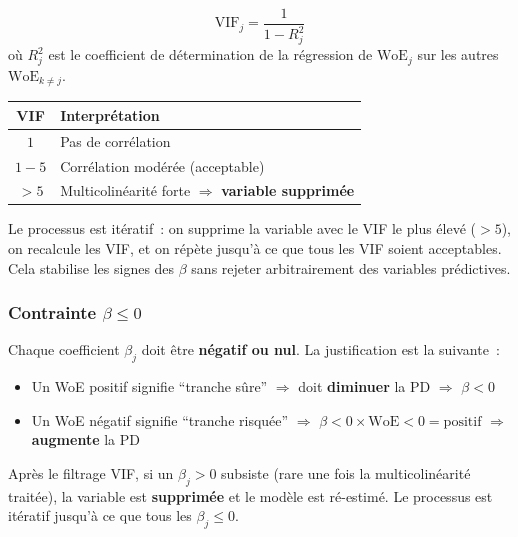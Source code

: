 \documentclass[12pt,a4paper]{article}
\begin{document}
\begin{formulebox}
\begin{equation}
    \text{VIF}_j = \frac{1}{1 - R_j^2}
    \label{eq:vif}
\end{equation}
o\`u $R_j^2$ est le coefficient de d\'etermination de la r\'egression de $\text{WoE}_j$ sur les autres $\text{WoE}_{k \neq j}$.
\end{formulebox}

\begin{center}
\begin{tabular}{cl}
\toprule
\textbf{VIF} & \textbf{Interpr\'etation} \\
\midrule
$1$ & Pas de corr\'elation \\
$1 - 5$ & Corr\'elation mod\'er\'ee (acceptable) \\
$> 5$ & Multicolin\'earit\'e forte $\Rightarrow$ \textbf{variable supprim\'ee} \\
\bottomrule
\end{tabular}
\end{center}

Le processus est it\'eratif~: on supprime la variable avec le VIF le plus \'elev\'e ($> 5$), on recalcule les VIF, et on r\'ep\`ete jusqu'\`a ce que tous les VIF soient acceptables. Cela stabilise les signes des $\beta$ sans rejeter arbitrairement des variables pr\'edictives.

\subsubsection{Contrainte $\beta \leq 0$}

Chaque coefficient $\beta_j$ doit \^etre \textbf{n\'egatif ou nul}. La justification est la suivante~:

\begin{itemize}
    \item Un WoE positif signifie ``tranche s\^ure'' $\Rightarrow$ doit \textbf{diminuer} la PD $\Rightarrow$ $\beta < 0$
    \item Un WoE n\'egatif signifie ``tranche risqu\'ee'' $\Rightarrow$ $\beta < 0 \times \text{WoE} < 0 = \text{positif}$ $\Rightarrow$ \textbf{augmente} la PD \checkmark
\end{itemize}

Apr\`es le filtrage VIF, si un $\beta_j > 0$ subsiste (rare une fois la multicolin\'earit\'e trait\'ee), la variable est \textbf{supprim\'ee} et le mod\`ele est r\'e-estim\'e. Le processus est it\'eratif jusqu'\`a ce que tous les $\beta_j \leq 0$.
\end{document}
